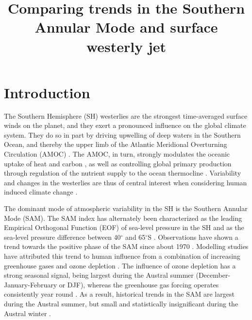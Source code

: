 \documentclass{ametsoc}
\title{Comparing trends in the Southern Annular Mode and surface westerly jet}
\affiliation{Canadian Center for Climate Modelling and Analysis, Victoria, BC, Canada}
\begin{document}
\maketitle

\section{Introduction}
The Southern Hemisphere (SH) westerlies are the strongest time-averaged surface winds on the planet,  and they 
exert a pronounced influence on the global climate system. They do so in part by driving upwelling of deep waters
in the Southern Ocean, and thereby the upper limb of the Atlantic Meridional Overturning Circulation (AMOC)
\citep{Toggweiler_Samuels_1995, Marshall_and_Speer_2012}. The AMOC, in turn, strongly modulates the oceanic 
uptake of heat and carbon \citep{Kostov_et_al_2014, Frolicher_et_al_2014}, as well as controlling global 
primary production through regulation of the nutrient supply to the ocean thermocline \citep{Sarmiento_et_al_2003, 
Marinov_et_al_2006}. Variability and changes in the westerlies are thus of central interest when considering 
human induced climate change \citep{Toggweiler_and_Russell_2008}.

The dominant mode of atmospheric variability in the SH is the Southern Annular Mode (SAM). The SAM index
has alternately been characterized as the leading Empirical Orthogonal Function (EOF) of sea-level pressure in the SH
\citep{Thompson_and_Wallace_2000} and as the sea-level pressure
difference between 40$^{\circ}$ and 65$^{\circ}$S \citep{Gong_and_Wang_1999}. Observations have shown a trend
towards the positive phase of the SAM since about 1970 \citep{Thompson_and_Solomon_2002, Marshall_2003}. Modelling
studies have attributed this trend to human influence from a combination of increasing greenhouse gases
and ozone depletion \citep{Fyfe_et_al_1999, Son_et_al_2010, Gillett_et_al_2013}. The influence of ozone depletion
has a strong seasonal signal, being largest during the Austral summer (December-January-February or DJF), 
whereas the greenhouse gas forcing operates consistently year round 
\citep{Son_et_al_2010, Thompson_et_al_2011, Gillett_et_al_2013}. As a result, historical trends in the SAM
are largest during the Austral summer, but small and 
statistically insignificant during the Austral winter \citep{Thompson_et_al_2011}.
\end{document}
